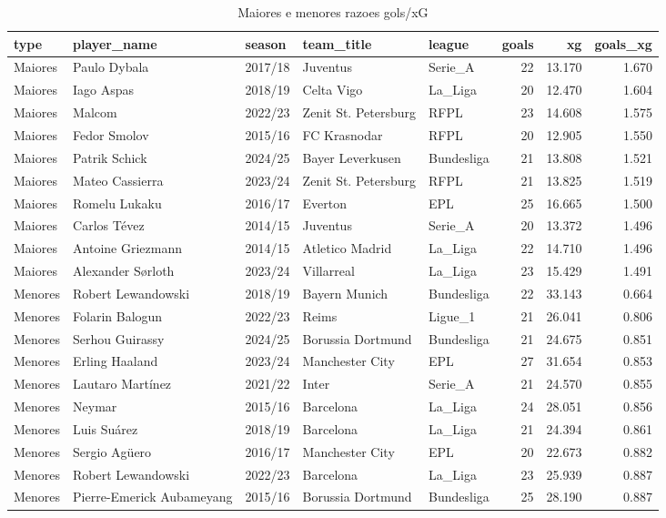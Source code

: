 \begin{table}

\caption{\label{tab:extremos_g20}Maiores e menores razoes gols/xG}
\centering
\begin{tabular}[t]{lllllrrr}
\toprule
type & player\_name & season & team\_title & league & goals & xg & goals\_xg\\
\midrule
Maiores & Paulo Dybala & 2017/18 & Juventus & Serie\_A & 22 & 13.170 & 1.670\\
Maiores & Iago Aspas & 2018/19 & Celta Vigo & La\_Liga & 20 & 12.470 & 1.604\\
Maiores & Malcom & 2022/23 & Zenit St. Petersburg & RFPL & 23 & 14.608 & 1.575\\
Maiores & Fedor Smolov & 2015/16 & FC Krasnodar & RFPL & 20 & 12.905 & 1.550\\
Maiores & Patrik Schick & 2024/25 & Bayer Leverkusen & Bundesliga & 21 & 13.808 & 1.521\\
\addlinespace
Maiores & Mateo Cassierra & 2023/24 & Zenit St. Petersburg & RFPL & 21 & 13.825 & 1.519\\
Maiores & Romelu Lukaku & 2016/17 & Everton & EPL & 25 & 16.665 & 1.500\\
Maiores & Carlos Tévez & 2014/15 & Juventus & Serie\_A & 20 & 13.372 & 1.496\\
Maiores & Antoine Griezmann & 2014/15 & Atletico Madrid & La\_Liga & 22 & 14.710 & 1.496\\
Maiores & Alexander Sørloth & 2023/24 & Villarreal & La\_Liga & 23 & 15.429 & 1.491\\
\addlinespace
Menores & Robert Lewandowski & 2018/19 & Bayern Munich & Bundesliga & 22 & 33.143 & 0.664\\
Menores & Folarin Balogun & 2022/23 & Reims & Ligue\_1 & 21 & 26.041 & 0.806\\
Menores & Serhou Guirassy & 2024/25 & Borussia Dortmund & Bundesliga & 21 & 24.675 & 0.851\\
Menores & Erling Haaland & 2023/24 & Manchester City & EPL & 27 & 31.654 & 0.853\\
Menores & Lautaro Martínez & 2021/22 & Inter & Serie\_A & 21 & 24.570 & 0.855\\
\addlinespace
Menores & Neymar & 2015/16 & Barcelona & La\_Liga & 24 & 28.051 & 0.856\\
Menores & Luis Suárez & 2018/19 & Barcelona & La\_Liga & 21 & 24.394 & 0.861\\
Menores & Sergio Agüero & 2016/17 & Manchester City & EPL & 20 & 22.673 & 0.882\\
Menores & Robert Lewandowski & 2022/23 & Barcelona & La\_Liga & 23 & 25.939 & 0.887\\
Menores & Pierre-Emerick Aubameyang & 2015/16 & Borussia Dortmund & Bundesliga & 25 & 28.190 & 0.887\\
\bottomrule
\end{tabular}
\end{table}
